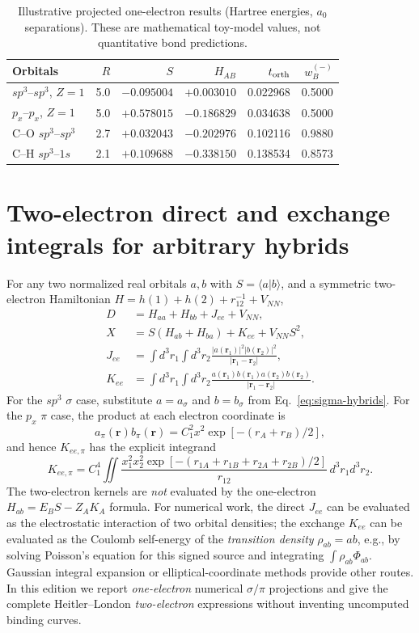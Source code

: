 \documentclass[11pt,letterpaper]{article}
\begin{document}
\begin{table}[htbp]\centering\small
\caption{Illustrative projected one-electron results (Hartree energies, $a_0$ separations). These are mathematical toy-model values, not quantitative bond predictions.}
\begin{tabular}{lrrrrr}
\toprule
Orbitals & $R$ & $S$ & $H_{AB}$ & $t_{\rm orth}$ & $w_B^{(-)}$\\\midrule
$sp^3$--$sp^3$, $Z=1$ & 5.0 & $-0.095004$ & $+0.003010$ & 0.022968 & 0.5000\\
$p_x$--$p_x$, $Z=1$ & 5.0 & $+0.578015$ & $-0.186829$ & 0.034638 & 0.5000\\
C--O $sp^3$--$sp^3$ & 2.7 & $+0.032043$ & $-0.202976$ & 0.102116 & 0.9880\\
C--H $sp^3$--$1s$ & 2.1 & $+0.109688$ & $-0.338150$ & 0.138534 & 0.8573\\
\bottomrule
\end{tabular}
\end{table}

\section{Two-electron direct and exchange integrals for arbitrary hybrids}\label{app:twoelectron}
For any two normalized real orbitals $a,b$ with $S=\langle a|b\rangle$, and a symmetric two-electron Hamiltonian $H=h(1)+h(2)+r_{12}^{-1}+V_{NN}$,
\begin{align}
D&=H_{aa}+H_{bb}+J_{ee}+V_{NN},\\
X&=S(H_{ab}+H_{ba})+K_{ee}+V_{NN}S^2,\\
J_{ee}&=\int d^3r_1\int d^3r_2\frac{|a(\mathbf r_1)|^2|b(\mathbf r_2)|^2}{|\mathbf r_1-\mathbf r_2|},\\
K_{ee}&=\int d^3r_1\int d^3r_2\frac{a(\mathbf r_1)b(\mathbf r_1)a(\mathbf r_2)b(\mathbf r_2)}{|\mathbf r_1-\mathbf r_2|}.
\end{align}
For the $sp^3$ $\sigma$ case, substitute $a=a_\sigma$ and $b=b_\sigma$ from Eq.~\eqref{eq:sigma-hybrids}. For the $p_x$ $\pi$ case, the product at each electron coordinate is
\begin{equation}
a_\pi(\mathbf r)b_\pi(\mathbf r)
=C_1^2x^2\exp[-(r_A+r_B)/2],
\end{equation}
and hence $K_{ee,\pi}$ has the explicit integrand
\begin{equation}
K_{ee,\pi}=C_1^4\iint \frac{x_1^2x_2^2\exp[-(r_{1A}+r_{1B}+r_{2A}+r_{2B})/2]}{r_{12}}\,d^3r_1d^3r_2.
\end{equation}
The two-electron kernels are \emph{not} evaluated by the one-electron $H_{ab}=E_BS-Z_AK_A$ formula. For numerical work, the direct $J_{ee}$ can be evaluated as the electrostatic interaction of two orbital densities; the exchange $K_{ee}$ can be evaluated as the Coulomb self-energy of the \emph{transition density} $\rho_{ab}=ab$, e.g., by solving Poisson's equation for this signed source and integrating $\int\rho_{ab}\Phi_{ab}$. Gaussian integral expansion or elliptical-coordinate methods provide other routes. In this edition we report \emph{one-electron} numerical $\sigma/\pi$ projections and give the complete Heitler--London \emph{two-electron} expressions without inventing uncomputed binding curves.
\end{document}
